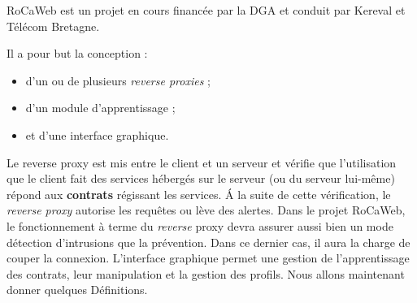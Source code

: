 \documentclass[a4paper,10pt,justified]{book}
\begin{document}
RoCaWeb est un projet en cours financée par la DGA et conduit par Kereval et Télécom Bretagne.


Il a pour but la conception :
\begin{itemize}
 \item d'un ou de plusieurs \textit{reverse proxies} ;
 \item d'un module d'apprentissage ; 
 \item et d'une interface graphique. 
\end{itemize}

Le reverse proxy est mis entre le client et un serveur et vérifie que l'utilisation que le client fait des services hébergés sur le serveur (ou du serveur lui-même)
répond aux \textbf{contrats} régissant les services.  \'A la suite de cette vérification, le \textit{reverse proxy} autorise les requêtes ou lève des alertes. 
Dans le projet RoCaWeb, le fonctionnement à terme du \textit{reverse} proxy devra assurer aussi bien un mode détection d'intrusions que la prévention. 
Dans ce dernier cas, il aura la charge de couper la connexion. 
L'interface graphique permet une gestion de l'apprentissage des contrats, leur manipulation et la gestion des profils.
Nous allons maintenant donner quelques Définitions. 
\end{document}
